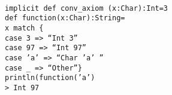 \documentclass{standalone}
\begin{document}
\texttt{
    \phantom{x}\\
    implicit def conv\_axiom (x:Char):Int=3\\
    def function(x:Char):String=\\
    \phantom{x}x match \{\\
    \phantom{xx} case 3 => ``Int 3''\\
    \phantom{xx} case 97 => ``Int 97''\\
    \phantom{xx} case 'a' => ``Char 'a' ''\\
    \phantom{xx} case \_ => ``Other''\}\\
    println(function('a')\\[5mm]
    > Int 97}
\end{document}
